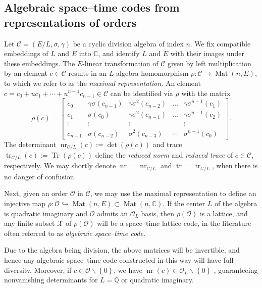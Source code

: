 \documentclass[smallextended]{svjour3}
\newcommand{\Q}{\mathbb{Q}}
\newcommand{\C}{\mathbb{C}}
\newcommand{\mcc}{\mathcal{C}}
\newcommand{\Or}{\mathcal{O}}
\DeclareMathOperator{\Mat}{Mat}
\DeclareMathOperator{\nr}{nr}
\DeclareMathOperator{\tr}{tr}
\DeclareMathOperator{\Tr}{Tr}
\begin{document}
\subsection{Algebraic space--time codes from representations of orders}
\label{subsec:stc_orders}

Let $\mcc = (E/L,\sigma,\gamma)$ be a cyclic division algebra of index $n$. We fix compatible embeddings of $L$ and $E$ into $\C$, and identify $L$ and $E$ with their images under these embeddings. 
The $E$-linear transformation of $\mcc$ given by left multiplication by an element $c \in \mcc$ results in an $L$-algebra homomorphism
$\rho: \mcc \to \Mat(n,E),$
to which we refer to as the \emph{maximal representation}. 
An element $c = c_0 +  u c_1+ \cdots + u^{n-1} c_{n-1} \in \mcc$ can be identified via $\rho$
with the matrix 
\begin{equation}
\label{eqn:lrr}
	\rho(c) = \begin{bmatrix}
 c_0& \gamma\sigma(c_{n-1})&\gamma \sigma^2(c_{n-2})& \ldots &\gamma \sigma^{n-1}(c_{1})\\
c_1& \sigma(c_{0})&\gamma\sigma^2(c_{n-1})& \ldots &\gamma \sigma^{n-1}(c_{2})\\
\vdots & \vdots & \vdots & & \vdots \\
c_{n-1} & \sigma(c_{n-2}) & \sigma^2(c_{n-3})& \cdots &\sigma^{n-1}(c_{0})
\end{bmatrix}.
\end{equation}
The determinant $\nr_{\mathcal{C}/L}(c) := \det(\rho(c))$ and trace $\tr_{\mathcal{C}/L}(c) := \Tr(\rho(c))$ define the \emph{reduced norm} and \emph{reduced trace} of $c \in \mathcal{C}$, respectively. We may shortly denote $\nr=\nr_{\mathcal{C}/L}$ and $\tr=\tr_{\mathcal{C}/L}$, when there is no danger of confusion.

Next, given an order $\Or$ in $\mcc$, we may use the maximal representation to define an injective map $\rho: \Or \hookrightarrow \Mat(n,E) \subset \Mat(n, \C)$. If the center $L$ of the algebra is quadratic imaginary and $\Or$ admits an $\Or_L$ basis, then $\rho(\Or)$ is a lattice, and any finite subset $\mathcal{X}$ of $\rho(\Or)$ will be a space--time lattice code, in the literature often referred to as \emph{algebraic space--time code}. 	

\begin{remark}
Due to the algebra being division, the above matrices will be invertible, and hence any algebraic space--time code constructed in this way will have full diversity. Moreover, if $c \in \Or\backslash \left\{0\right\}$, we have $\nr(c) \in \Or_L\backslash\left\{0\right\}$ \cite[Thm. 10.1]{Re}, guaranteeing nonvanishing determinants for $L = \Q$ or quadratic imaginary.  
\end{remark}
\end{document}
